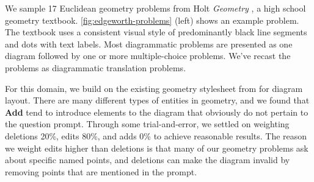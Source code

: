 We sample 17 Euclidean geometry problems from Holt \textit{Geometry} \cite{burger2007holt}, a high school geometry textbook. \cref{fig:edgeworth-problems} (left) shows an example problem. The textbook uses a consistent visual style of predominantly black line segments and dots with text labels. Most diagrammatic problems are presented as one diagram followed by one or more multiple-choice problems. We've recast the problems as diagrammatic translation problems.

For this domain, we build on the existing geometry stylesheet from \Penrose \cite[Section~5.3]{penrose} for diagram layout. There are many different types of entities in geometry, and we found that \textbf{Add} tend to introduce elements to the diagram that obviously do not pertain to the question prompt.
Through some trial-and-error, we settled on weighting deletions 20\%, edits 80\%, and adds 0\% to achieve reasonable results. The reason we weight edits higher than deletions is that many of our geometry problems ask about specific named points, and deletions can make the diagram invalid by removing points that are mentioned in the prompt.



